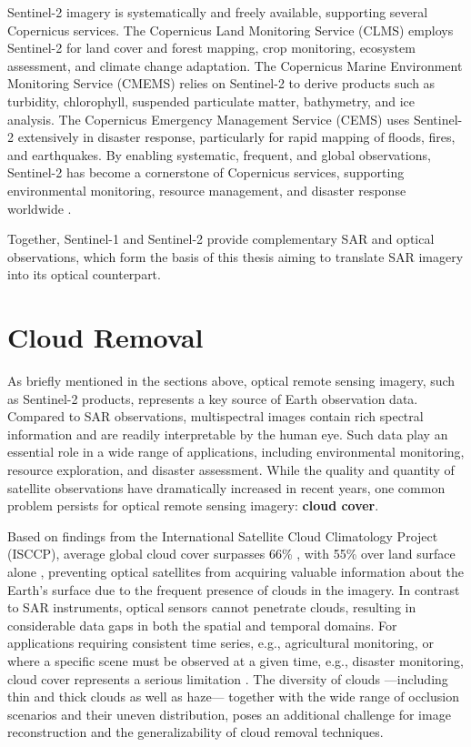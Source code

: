 Sentinel-2 imagery is systematically and freely available, supporting several Copernicus services. The Copernicus Land Monitoring Service (CLMS) employs Sentinel-2 for land cover and forest mapping, crop monitoring, ecosystem assessment, and climate change adaptation. The Copernicus Marine Environment Monitoring Service (CMEMS) relies on Sentinel-2 to derive products such as turbidity, chlorophyll, suspended particulate matter, bathymetry, and ice analysis. The Copernicus Emergency Management Service (CEMS) uses Sentinel-2 extensively in disaster response, particularly for rapid mapping of floods, fires, and earthquakes. By enabling systematic, frequent, and global observations, Sentinel-2 has become a cornerstone of Copernicus services, supporting environmental monitoring, resource management, and disaster response worldwide \cite{sentiwiki}.  

Together, Sentinel-1 and Sentinel-2 provide complementary SAR and optical observations, which form the basis of this thesis aiming to translate SAR imagery into its optical counterpart.

\section{Cloud Removal}
As briefly mentioned in the sections above, optical remote sensing imagery, such as Sentinel-2 products, represents a key source of Earth observation data. Compared to SAR observations, multispectral images contain rich spectral information and are readily interpretable by the human eye. Such data play an essential role in a wide range of applications, including environmental monitoring, resource exploration, and disaster assessment. While the quality and quantity of satellite observations have dramatically increased in recent years, one common problem persists for optical remote sensing imagery: \textbf{cloud cover}.

Based on findings from the International Satellite Cloud Climatology Project (ISCCP), average global cloud cover surpasses 66\% \cite{dl_cloud_detection_survey,aCGAN_fuse_sar_MS,CR_SEN2_dRNN}, with 55\% over land surface alone \cite{CR_SEN2_dRNN}, preventing optical satellites from acquiring valuable information about the Earth's surface due to the frequent presence of clouds in the imagery. In contrast to SAR instruments, optical sensors cannot penetrate clouds, resulting in considerable data gaps in both the spatial and temporal domains. For applications requiring consistent time series, e.g., agricultural monitoring, or where a specific scene must be observed at a given time, e.g., disaster monitoring, cloud cover represents a serious limitation \cite{CR_SEN2_dRNN}. The diversity of clouds —including thin and thick clouds as well as haze— together with the wide range of occlusion scenarios and their uneven distribution, poses an additional challenge for image reconstruction and the generalizability of cloud removal techniques\cite{CR_Advances_Review_ORS}.

